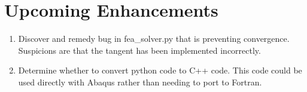 \section{Upcoming Enhancements}

\begin{enumerate}
\item Discover and remedy bug in fea\_solver.py that is preventing convergence. Suspicions are that the tangent has been implemented incorrectly.
\item Determine whether to convert python code to C++ code. This code could be used directly with Abaqus rather than needing to port to Fortran.
\end{enumerate}